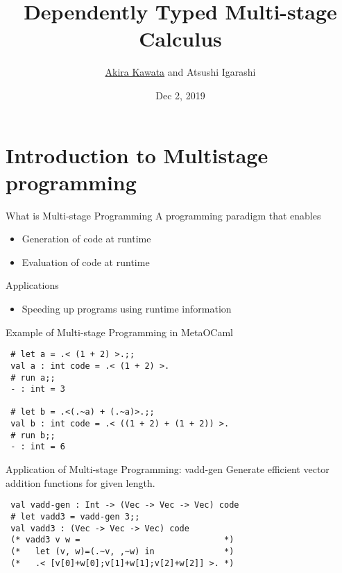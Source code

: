 \documentclass[dvipdfmx,aspectratio=169, 20pt]{beamer}
\title{Dependently Typed Multi-stage Calculus}
\author{\underline{Akira Kawata} and Atsushi Igarashi}
\institute{Graduate School of Informatics, Kyoto University}
\date{Dec 2, 2019}
\begin{document}
\maketitle


\section{Introduction to Multistage programming}

\begin{frame}[fragile]{What is Multi-stage Programming}
    A programming paradigm that enables
    \begin{itemize}
        \item Generation of code at runtime
        \item Evaluation of code at runtime
    \end{itemize}
    Applications
    \begin{itemize}
        \item Speeding up programs using runtime information
    \end{itemize}
    \note{
    }
\end{frame}

\begin{frame}[fragile]{Example of Multi-stage Programming in MetaOCaml}
    \begin{center}
        \begin{verbatim}
 # let a = .< (1 + 2) >.;;
 val a : int code = .< (1 + 2) >.
 # run a;;
 - : int = 3

 # let b = .<(.~a) + (.~a)>.;;
 val b : int code = .< ((1 + 2) + (1 + 2)) >. 
 # run b;;
 - : int = 6
        \end{verbatim}
    \end{center}
    \note{
    }
\end{frame}

\begin{frame}[fragile]{Application of Multi-stage Programming: vadd-gen}
    Generate efficient vector addition functions for given length.
    
    \begin{verbatim}
 val vadd-gen : Int -> (Vec -> Vec -> Vec) code
 # let vadd3 = vadd-gen 3;;
 val vadd3 : (Vec -> Vec -> Vec) code
 (* vadd3 v w =                             *)
 (*   let (v, w)=(.~v, ,~w) in              *)
 (*   .< [v[0]+w[0];v[1]+w[1];v[2]+w[2]] >. *)
    \end{verbatim}
    \note{
    }
\end{frame}
\end{document}
